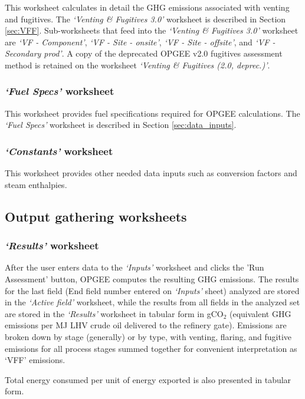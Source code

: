 \documentclass[11pt]{report}
\newcommand{\sheet}[1]{\textit{`{#1}'}}
\begin{document}
This worksheet calculates in detail the GHG emissions associated with venting and fugitives. The \sheet{Venting \& Fugitives 3.0} worksheet is described in Section \ref{sec:VFF}. Sub-worksheets that feed into the  \sheet{Venting \& Fugitives 3.0}  worksheet are \sheet{VF - Component}, \sheet{VF - Site - onsite}, \sheet{VF - Site - offsite}, and \sheet{VF - Secondary prod}. A copy of the deprecated OPGEE v2.0 fugitives assessment method is retained on the worksheet \sheet{Venting \& Fugitives (2.0, deprec.)}.

\subsubsection{\sheet{Fuel Specs} worksheet}

This worksheet provides fuel specifications required for OPGEE calculations. The \sheet{Fuel Specs} worksheet is described in Section \ref{sec:data_inputs}.

\subsubsection{\sheet{Constants} worksheet} 

This worksheet provides other needed data inputs such as conversion factors and steam enthalpies. 

\subsection{Output gathering worksheets} 

\subsubsection{\sheet{Results} worksheet}

After the user enters data to the \sheet{Inputs} worksheet and clicks the 'Run Assessment' button, OPGEE computes the resulting GHG emissions. The results for the last field (End field number entered on \sheet{Inputs} sheet) analyzed are stored in the \sheet{Active field} worksheet, while the results from all fields in the analyzed set are stored in the \sheet{Results} worksheet in tabular form in gCO$_2$ (equivalent GHG emissions per MJ LHV crude oil delivered to the refinery gate). Emissions are broken down by stage (generally) or by type, with venting, flaring, and fugitive emissions for all process stages summed together for convenient interpretation as `VFF' emissions. 

Total energy consumed per unit of energy exported is also presented in tabular form.
\end{document}
